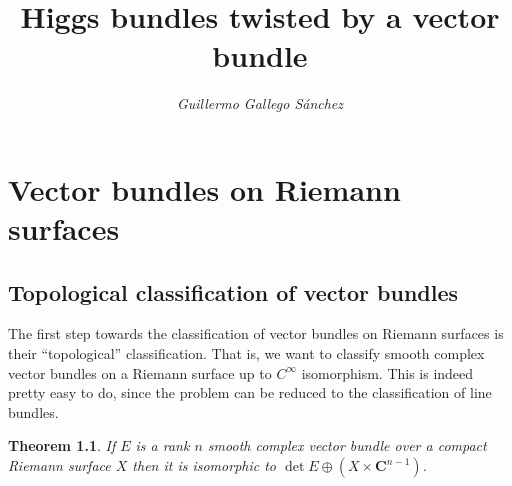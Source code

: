 \documentclass[12pt,a4paper]{book}
\title{\bfseries \sffamily Higgs bundles twisted by a vector bundle}
\author{\it Guillermo Gallego Sánchez}
\date{}
\newtheorem{thm}{Theorem}[section]
\theoremstyle{definition} \newtheorem{defn}[thm]{Definition}
\theoremstyle{definition} \newtheorem{ejemplo}[thm]{Example}
\theoremstyle{remark} \newtheorem*{rem}{Remark}
\def\CC{\mathbf{C}}
\begin{document}
\maketitle
\tableofcontents
\chapter{Vector bundles on Riemann surfaces}
\section{Topological classification of vector bundles}
The first step towards the classification of vector bundles on Riemann surfaces is their ``topological'' classification. That is, we want to classify smooth complex vector bundles on a Riemann surface up to $C^\infty$ isomorphism. This is indeed pretty easy to do, since the problem can be reduced to the classification of line bundles.
\begin{thm}
  If $E$ is a rank $n$ smooth complex vector bundle over a compact Riemann surface $X$ then it is isomorphic to $\det E \oplus (X\times \CC^{n-1})$.
\end{thm}
\end{document}
